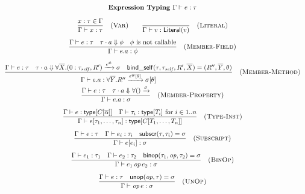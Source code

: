 \begin{figure*}[t]
\centering
\[
\begin{array}{c}
\textbf{Expression Typing } \Gamma \vdash e : \tau \\[1em]

\displaystyle\frac{x : \tau \in \Gamma}{\Gamma \vdash x : \tau} \quad \textsc{(Var)}
\qquad
\displaystyle\frac{}{\Gamma \vdash v : \mathsf{Literal}(v)} \quad \textsc{(Literal)}
\\[1.5em]

\displaystyle\frac{\Gamma \vdash e : \tau \quad \tau \cdot a \Downarrow \phi \quad \phi \text{ is not callable}}{\Gamma \vdash e.a : \phi} \quad \textsc{(Member-Field)}
\\[1.5em]

\displaystyle\frac{\Gamma \vdash e : \tau \quad \tau \cdot a \Downarrow \forall\overline{X}.(0:\tau_{\mathit{self}}, R') \xrightarrow{\epsilon^\#} \sigma \quad \mathsf{bind\_self}(\tau, \tau_{\mathit{self}}, R', \overline{X}) = (R'', \overline{Y}, \theta)}{\Gamma \vdash e.a : \forall\overline{Y}.R'' \xrightarrow{\epsilon^\#[\theta]} \sigma[\theta]} \quad \textsc{(Member-Method)}
\\[1.5em]

\displaystyle\frac{\Gamma \vdash e : \tau \quad \tau \cdot a \Downarrow \forall() \xrightarrow \sigma}{\Gamma \vdash e.a : \sigma} \quad \textsc{(Member-Property)}
\\[1.5em]

\displaystyle\frac{\Gamma \vdash e : \mathsf{type}[C[\overline{\alpha}]] \quad \Gamma \vdash \tau_i : \mathsf{type}[T_i] \text{ for } i \in 1..n}{\Gamma \vdash e[\tau_1, \ldots, \tau_n] : \mathsf{type}[C[T_1, \ldots, T_n]]} \quad \textsc{(Type-Inst)}
\\[1.5em]

\displaystyle\frac{\Gamma \vdash e : \tau \quad \Gamma \vdash e_i : \tau_i \quad \mathsf{subscr}(\tau, \tau_i) = \sigma}{\Gamma \vdash e[e_i] : \sigma} \quad \textsc{(Subscript)}
\\[1.5em]

\displaystyle\frac{\Gamma \vdash e_1 : \tau_1 \quad \Gamma \vdash e_2 : \tau_2 \quad \mathsf{binop}(\tau_1, \mathit{op}, \tau_2) = \sigma}{\Gamma \vdash e_1 \mathit{\,op\,} e_2 : \sigma} \quad \textsc{(BinOp)}
\\[1.5em]

\displaystyle\frac{\Gamma \vdash e : \tau \quad \mathsf{unop}(\mathit{op}, \tau) = \sigma}{\Gamma \vdash \mathit{op}\, e : \sigma} \quad \textsc{(UnOp)}
\\[2em]


\end{array}\]
\end{figure*}

